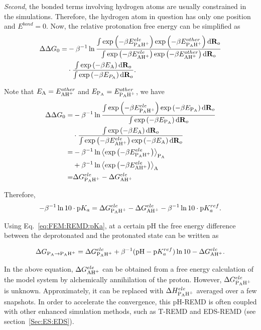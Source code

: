\textit{Second}, the bonded terms involving hydrogen atoms are usually 
constrained in the simulations. Therefore, the hydrogen atom in question has 
only one position and $E^{bond}=0$. Now, the 
relative protonation free energy can be simplified as
\begin{align}
\Delta\Delta G_{0}=&-\beta^{-1}\ln\frac{\int\exp\left(-\beta E_{\ce{P_{A}H^{+}}}^{ele}\right)\exp\left(-\beta E_{\ce{P_{A}H^{+}}}^{other}\right)\diff \mathbf{R}_{o}}{\int\exp\left(-\beta E_{\ce{AH^{+}}}^{ele}\right)\exp\left(-\beta E_{\ce{AH^{+}}}^{other}\right)\diff \mathbf{R}_{o}}\notag\\
&\cdot\frac{\int\exp\left(-\beta E_{\ce{A}}\right)\diff \mathbf{R}_{o}}{\int\exp\left(-\beta E_{P_{\ce{A}}}\right)\diff \mathbf{R}_{o}}.
\end{align}

Note that $E_{\ce{A}}=E_{\ce{AH^{+}}}^{other}$ and $E_{\ce{P_{A}}}=E_{\ce{P_{A}H^{+}}}^{other}$, we have
\begin{align}
	\Delta\Delta G_{0} = & -\beta^{-1}\ln\frac{\int\exp\left(-\beta E_{\ce{P_{A}H^{+}}}^{ele}\right)\exp\left(-\beta E_{\ce{P_{A}}}\right)\diff \mathbf{R}_{o}}{\int\exp\left(-\beta E_{\ce{P_{A}}}\right)\diff \mathbf{R}_{o}}\\
	& \cdot \frac{\int\exp\left(-\beta E_{\ce{A}}\right)\diff \mathbf{R}_{o}}{\int\exp\left(-\beta E_{\ce{AH^{+}}}^{ele}\right)\exp\left(-\beta E_{\ce{A}}\right)\diff \mathbf{R}_{o}}\\
	= & -\beta^{-1}\ln\left\langle \exp\left(-\beta E_{\ce{P_{A}H^{+}}}^{ele}\right)\right\rangle _{\ce{P_{A}}}\notag\\
	  &+\beta^{-1} \ln\left\langle \exp\left(-\beta E_{\ce{AH^{+}}}^{ele}\right)\right\rangle _{\ce{A}}\notag\\
	= & \Delta G_{\ce{P_{A}H^{+}}}^{ele}-\Delta G_{\ce{AH^{+}}}^{ele}  
\end{align}

Therefore,
\[
-\beta^{-1}\ln10\cdot \mathrm{p}K_{a}=\Delta G_{\ce{P_{A}H^{+}}}^{ele}-\Delta G_{\ce{AH^{+}}}^{ele}-\beta^{-1}\ln10\cdot \mathrm{p}K_{a}^{ref}.
\]

Using Eq.~\ref{eq:FEM:REMD:pKa}, at a certain pH the free energy difference between the deprotonated
and the protonated state can be written as

\[
\Delta G_{\ce{P_{A}}\rightarrow \ce{P_{A}H^{+}}}=\Delta G_{\ce{P_{A}H^{+}}}^{ele}+\beta^{-1}(\mathrm{pH}-\mathrm{p}K_{a}^{ref})\ln10-\Delta G_{\ce{AH^{+}}}^{ele}.
\]

In the above equation, $\Delta G_{\ce{AH^{+}}}^{ele}$ can be obtained from a free energy calculation of the model system by alchemically annihilation of the proton. However, $\Delta G_{\ce{P_{A}H^{+}}}^{ele}$ is unknown. Approximately, it can be replaced with $\Delta H_{\ce{P_{A}H^{+}}}^{ele}$ averaged over a few snapshots.\cite{MengJCTC2010} In order to accelerate the convergence,
this pH-REMD is often coupled with other enhanced simulation methods, such as T-REMD\cite{MengJCTC2010} and EDS-REMD\cite{LeeJCTC2014} (see section~\ref{Sec:ES:EDS}).
